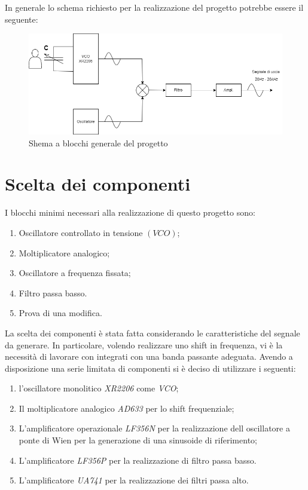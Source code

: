 \documentclass[titlepage]{report}
\begin{document}
	 In generale lo schema richiesto per la realizzazione del progetto potrebbe essere il seguente:
	 
	\begin{figure}[htbp]
		\centering
		\includegraphics[scale=0.5]{Immagini/Schema Generale PSEA.png}
		\caption{Shema a blocchi generale del progetto}
		\label{fig: schema a blocchi generico}
	\end{figure}	


\newpage

	
\chapter{Scelta dei componenti}
	\label{ch:Scelta_componenti}
	I blocchi minimi necessari alla realizzazione di questo progetto sono:
	
	\begin{enumerate}
		\item Oscillatore controllato in tensione $(VCO)$;
		\item Moltiplicatore analogico;
		\item Oscillatore a frequenza fissata;
		\item Filtro passa basso.
		\item Prova di una modifica.
	\end{enumerate}
	
	\noindent La scelta dei componenti è stata fatta considerando le caratteristiche del segnale da generare. In particolare, volendo realizzare uno shift in frequenza, vi è la necessità di lavorare con integrati con una banda passante adeguata.
	Avendo a disposizione una serie limitata di componenti si è deciso di utilizzare i seguenti:
	
	\begin{enumerate}
		\item l'oscillatore monolitico \textit{XR2206} come \textit{VCO};
		\item Il moltiplicatore analogico \textit{AD633} per lo shift frequenziale;
		\item L'amplificatore operazionale \textit{LF356N} per la realizzazione dell oscillatore a ponte di Wien per la generazione di una sinusoide di riferimento;
		\item L'amplificatore \textit{LF356P} per la realizzazione di filtro passa basso.
		\item L'amplificatore \textit{UA741} per la realizzazione dei filtri passa alto.
	\end{enumerate}
	
\end{document}
